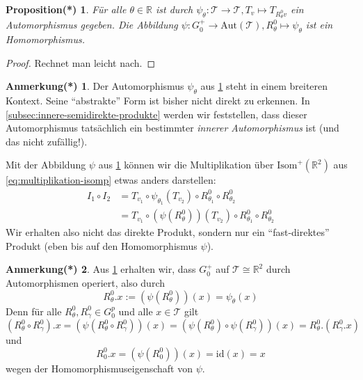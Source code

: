 \documentclass[a4paper, ngerman]{article}
\newcounter{chapter}
\numberwithin{equation}{chapter}
\theoremstyle{plain}
\newtheorem{propositionstrd}{Proposition(*)}[chapter]
\theoremstyle{definition}
\newtheorem{annotationstrd}{Anmerkung(*)}[chapter]
\newcommand{\id}{\ensuremath{\text{id}}}
\newcommand{\geradisometr}{\ensuremath{\mathrm{Isom}^+(\mathbb R^2)}}
\newcommand{\anm}[1]{{\color{red} #1}}
\begin{document}
\begin{propositionstrd}\label{prop*:wirkung-auf-translationen}
    Für alle \(\theta \in \mathbb R\) ist durch \(\psi_\theta: \mathcal T \to \mathcal T, T_v \mapsto T_{R_\theta^0 v}\) ein Automorphismus gegeben. Die Abbildung \(\psi:G_0^+\to \mathrm{Aut}(\mathcal T), R_\theta^0 \mapsto \psi_\theta\) ist ein Homomorphismus. 
\end{propositionstrd}
\begin{proof}
    Rechnet man leicht nach.%
\end{proof}
\begin{annotationstrd}\label{ann*:breiterer-kontext-für-automorphismus}
    Der Automorphismus \(\psi_\theta\) aus \cref{prop*:wirkung-auf-translationen} steht in einem breiteren Kontext. Seine "`abstrakte"' Form ist bisher nicht direkt zu erkennen. In \cref{subsec:innere-semidirekte-produkte} werden wir feststellen, dass dieser Automorphismus tatsächlich ein bestimmter \textit{innerer Automorphismus} ist (und das nicht zufällig!). 
\end{annotationstrd}
Mit der Abbildung \(\psi\) aus \cref{prop*:wirkung-auf-translationen} können wir die Multiplikation über \(\geradisometr\) aus \eqref{eq:multiplikation-isomp} etwas anders darstellen: 
\begin{align*}
    I_1\circ I_2 &= T_{v_1} \circ \psi_{\theta_1}(T_{v_2})\circ R_{\theta_1}^0\circ R_{\theta_2}^0 \\
    &= T_{v_1} \circ (\psi(R_\theta^0))(T_{v_2})\circ R_{\theta_1}^0\circ R_{\theta_2}^0
\end{align*}
Wir erhalten also nicht das direkte Produkt, sondern nur ein "`fast-direktes"' Produkt (eben bis auf den Homomorphismus \(\psi\)). 

\begin{annotationstrd}
    Aus \cref{prop*:wirkung-auf-translationen} erhalten wir, dass \(G_0^+\) auf \(\mathcal T\cong \mathbb R^2\) durch Automorphismen operiert, also durch 
    \begin{equation*}
        R_\theta^0.x := (\psi(R_\theta^0))(x) = \psi_\theta(x)
    \end{equation*}
    Denn für alle \(R_\theta^0, R_\gamma^0 \in G_0^p\) und alle \(x \in \mathcal T\) gilt
    \begin{equation*}
        (R_\theta^0 \circ R_\gamma^0).x = (\psi(R_\theta^0\circ R_\gamma^0))(x) = (\psi(R_\theta^0)\circ \psi(R_\gamma^0))(x) = R_\theta^0.(R_\gamma^0.x)
    \end{equation*} 
    und
    \begin{equation*}
        R_0^0.x = (\psi(R_0^0))(x) = \id(x) = x
    \end{equation*}
    wegen der Homomorphismuseigenschaft von \(\psi\). 
\end{annotationstrd}
\end{document}
